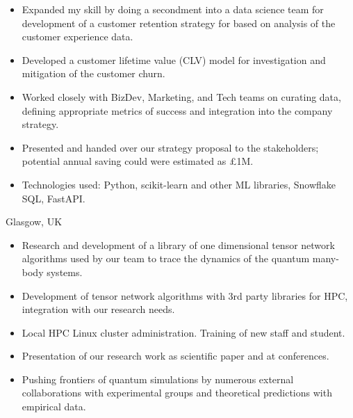 \documentclass[10pt,a4paper,ragged2e,withhyper]{altacv}
\begin{document}
\begin{paracol}{2}
\begin{itemize}

    \item
    Expanded my skill by doing a secondment into a data science team for
    development of a customer retention strategy for based on analysis of the
    customer experience data.
    
    \item
    Developed a customer lifetime value (CLV) model for investigation and
    mitigation of the customer churn.

    \item
    Worked closely with BizDev, Marketing, and Tech teams on curating data,
    defining appropriate metrics of success and integration into the company
    strategy.

    \item
    Presented and handed over our strategy proposal to the stakeholders; 
    potential annual saving could were estimated as £1M.

    \item
    Technologies used: Python, scikit-learn and other ML libraries,
    Snowflake SQL, FastAPI.

\end{itemize}

\divider

{Glasgow, UK}

\begin{itemize}

    \item
    Research and development of a library of one dimensional tensor network
    algorithms used by our team to trace the dynamics of the quantum many-body
    systems.

    \item
    Development of tensor network algorithms with 3rd party libraries for HPC,
    integration with our research needs.

    \item
    Local HPC Linux cluster administration. Training of new staff and student.

    \item
    Presentation of our research work as scientific paper and at conferences.
    
    \item
    Pushing frontiers of quantum simulations by numerous external collaborations
    with experimental groups and theoretical predictions with empirical data.


\end{itemize}
\end{paracol}
\end{document}
